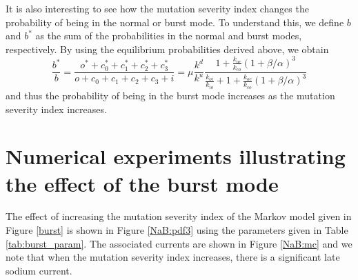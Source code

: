 It is also interesting to see how the mutation severity index changes the
probability of being in the normal or burst mode. To understand
this, we define $b$ and $b^{\ast}$ as the sum of the probabilities in the
normal and burst modes, respectively. By using the equilibrium probabilities
derived above, we obtain
\[
\frac{b^{\ast}}{b}=\frac{o^{\ast}+c_{0}^{\ast}+c_{1}^{\ast}+c_{2}^{\ast}
+c_{3}^{\ast}}{o+c_{0}+c_{1}+c_{2}+c_{3}+i}=\mu\frac{k^{d}}{k^{u}}
\frac{1+\frac{k_{oc}}{k_{co}}\left(  1+\beta/\alpha\right)  ^{3}}
{\frac{k_{oi}}{k_{io}}+1+\frac{k_{oc}}{k_{co}}\left(  1+\beta/\alpha\right)
^{3}}
\]
and thus the probability of being in the burst mode increases as the mutation
severity index increases.

\bigskip

\section[Numerical experiments; burst mode]{Numerical experiments illustrating the effect of the burst mode}



The effect of increasing the mutation severity index of the Markov model given in Figure \ref{burst} is shown in
 Figure \ref{NaB:pdf3} using the parameters given in Table \ref{tab:burst_param}.
 The associated currents are shown in Figure
 \ref{NaB:mc} and we note that when the mutation severity index increases, there is a significant late sodium current.
 
